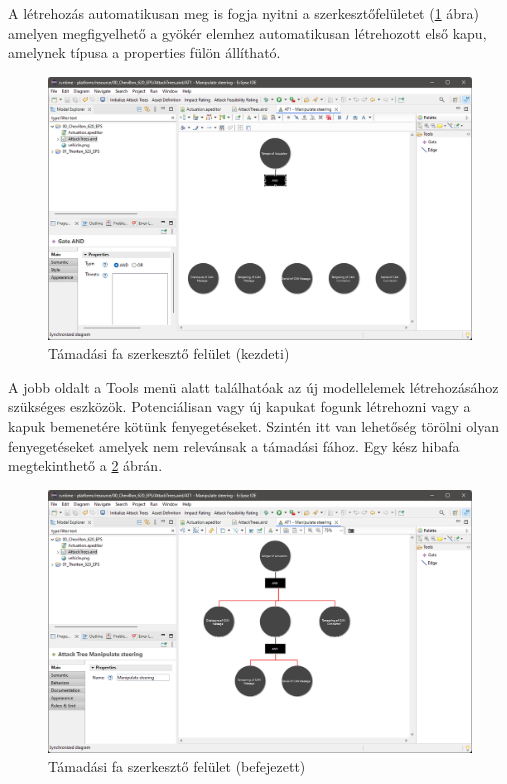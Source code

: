 A létrehozás automatikusan meg is fogja nyitni a szerkesztőfelületet (\ref{fig:05_ateditor_2} ábra) amelyen megfigyelhető a gyökér elemhez automatikusan létrehozott első kapu, amelynek típusa a properties fülön állítható.

\begin{figure}[!ht]
	\centering
	\includegraphics[width=130mm, keepaspectratio]{figures/05_ateditor_2.png}
	\caption{Támadási fa szerkesztő felület (kezdeti)}
	\label{fig:05_ateditor_2}
\end{figure}

A jobb oldalt a Tools menü alatt találhatóak az új modellelemek létrehozásához szükséges eszközök. Potenciálisan vagy új kapukat fogunk létrehozni vagy a kapuk bemenetére kötünk fenyegetéseket. Szintén itt van lehetőség törölni olyan fenyegetéseket amelyek nem relevánsak a támadási fához. Egy kész hibafa megtekinthető a \ref{fig:05_ateditor_3} ábrán.

\begin{figure}[!ht]
	\centering
	\includegraphics[width=130mm, keepaspectratio]{figures/05_ateditor_3.png}
	\caption{Támadási fa szerkesztő felület (befejezett)}
	\label{fig:05_ateditor_3}
\end{figure}

